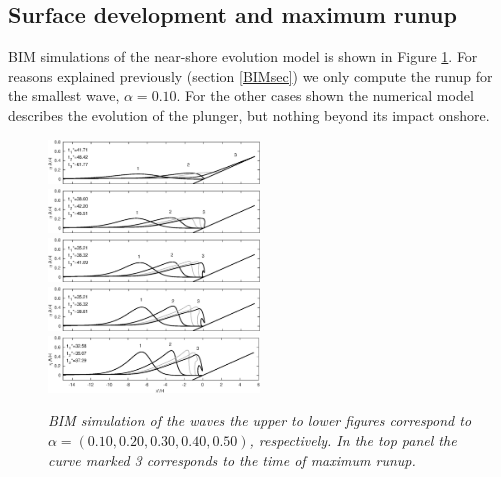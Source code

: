 \documentclass[review, authoryear]{elsarticle}
\begin{document}
\subsection{Surface development and maximum runup}
\label{max_run}

BIM simulations of the near-shore evolution model is shown in Figure \ref{fig:BIM}.
For reasons explained previously (section \ref{BIMsec}) we only compute the runup for the 
smallest wave, $\alpha=0.10$.  For the other cases shown the numerical
model describes the evolution of the plunger, but nothing beyond its impact onshore.  
\begin{figure}[]
\centering 
\includegraphics[width=0.5\textwidth]{./Figures/BIM/case10_BIM_runup_r.eps}
\includegraphics[width=0.5\textwidth]{./Figures/BIM/case20_BIM_runup_r.eps}
\includegraphics[width=0.5\textwidth]{./Figures/BIM/case30_BIM_runup_r.eps}
\includegraphics[width=0.5\textwidth]{./Figures/BIM/case40_BIM_runup_r.eps}
\includegraphics[width=0.5\textwidth]{./Figures/BIM/case50_BIM_runup_r.eps}
\caption{\textit{BIM simulation of the waves the upper to lower figures correspond to $\alpha=(0.10, 0.20, 0.30, 0.40, 0.50)$, respectively. In the top panel the curve marked 3 corresponds to the time of maximum runup.}}
\label{fig:BIM}
\end{figure}
\end{document}
